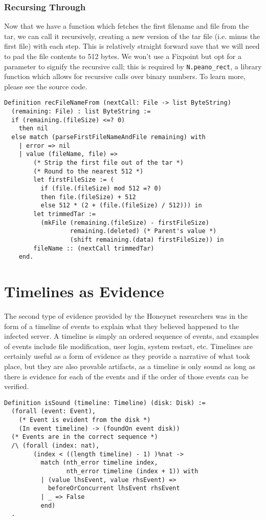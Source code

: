\documentclass[nocopyrightspace]{sigplanconf}
\begin{document}
\subsubsection{Recursing Through}
Now that we have a function which fetches the first filename and file from the
tar, we can call it recursively, creating a new version of the tar file (i.e.
minus the first file) with each step. This is relatively straight forward save
that we will need to pad the file contents to 512 bytes. We won't use a
Fixpoint but opt for a parameter to signify the recursive call; this is
required by {\tt N.peano\_rect}, a library function which allows for recursive
calls over binary numbers. To learn more, please see the source code.

\begin{lstlisting}
Definition recFileNameFrom (nextCall: File -> list ByteString) 
  (remaining: File) : list ByteString :=
  if (remaining.(fileSize) <=? 0)
    then nil
  else match (parseFirstFileNameAndFile remaining) with
    | error => nil
    | value (fileName, file) =>
        (* Strip the first file out of the tar *)
        (* Round to the nearest 512 *)
        let firstFileSize := (
          if (file.(fileSize) mod 512 =? 0)
          then file.(fileSize) + 512
          else 512 * (2 + (file.(fileSize) / 512))) in
        let trimmedTar := 
          (mkFile (remaining.(fileSize) - firstFileSize)
                  remaining.(deleted) (* Parent's value *)
                  (shift remaining.(data) firstFileSize)) in
        fileName :: (nextCall trimmedTar)
    end.
\end{lstlisting}


\section{Timelines as Evidence}

The second type of evidence provided by the Honeynet researchers was in the
form of a timeline of events to explain what they believed happened to the
infected server. A timeline is simply an ordered sequence of events, and
examples of events include file modification, user login, system restart, etc.
Timelines are certainly useful as a form of evidence as they provide a
narrative of what took place, but they are also provable artifacts, as a
timeline is only sound as long as there is evidence for each of the events and
if the order of those events can be verified.

\begin{lstlisting}
Definition isSound (timeline: Timeline) (disk: Disk) :=
  (forall (event: Event),
    (* Event is evident from the disk *)
    (In event timeline) -> (foundOn event disk))
  (* Events are in the correct sequence *)
  /\ (forall (index: nat),
        (index < ((length timeline) - 1) )%nat ->
          match (nth_error timeline index,
                 nth_error timeline (index + 1)) with
          | (value lhsEvent, value rhsEvent) => 
            beforeOrConcurrent lhsEvent rhsEvent
          | _ => False
          end)
  .
\end{lstlisting}
\end{document}
